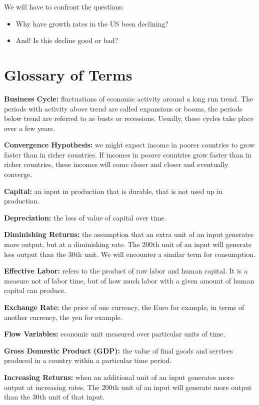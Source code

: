 \documentclass[
]{book}
\providecommand{\tightlist}{%
  \setlength{\itemsep}{0pt}\setlength{\parskip}{0pt}}
\begin{document}
We will have to confront the questions:

\begin{itemize}
\tightlist
\item
  Why have growth rates in the US been declining?
\item
  And! Is this decline good or bad?
\end{itemize}

\hypertarget{glossary-of-terms-1}{%
\section{Glossary of Terms}\label{glossary-of-terms-1}}

\textbf{Business Cycle:} fluctuations of economic activity around a long run trend. The periods with activity above trend are called expansions or booms, the periods below trend are referred to as busts or recessions. Usually, these cycles take place over a few years.

\textbf{Convergence Hypothesis:} we might expect income in poorer countries to grow faster than in richer countries. If incomes in poorer countries grow faster than in richer countries, these incomes will come closer and closer and eventually converge.

\textbf{Capital:} an input in production that is durable, that is not used up in production.

\textbf{Depreciation:} the loss of value of capital over time.

\textbf{Diminishing Returns:} the assumption that an extra unit of an input generates more output, but at a diminishing rate. The 200th unit of an input will generate less output than the 30th unit. We will encounter a similar term for consumption.

\textbf{Effective Labor:} refers to the product of raw labor and human capital. It is a measure not of labor time, but of how much labor with a given amount of human capital can produce.

\textbf{Exchange Rate:} the price of one currency, the Euro for example, in terms of another currency, the yen for example.

\textbf{Flow Variables:} economic unit measured over particular units of time.

\textbf{Gross Domestic Product (GDP):} the value of final goods and services produced in a country within a particular time period.

\textbf{Increasing Returns:} when an additional unit of an input generates more output at increasing rates. The 200th unit of an input will generate more output than the 30th unit of that input.
\end{document}
